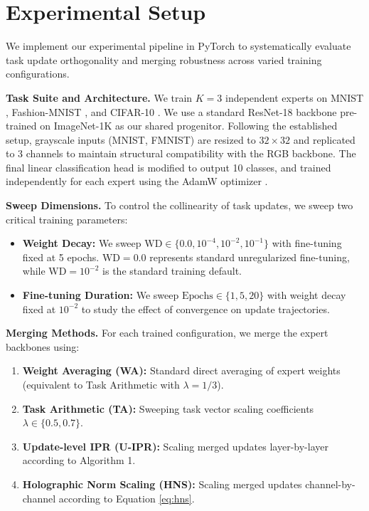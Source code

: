 \documentclass{article}
\theoremstyle{plain}
\theoremstyle{definition}
\theoremstyle{remark}
\begin{document}
\section{Experimental Setup}
\label{sec:setup}

We implement our experimental pipeline in PyTorch to systematically evaluate task update orthogonality and merging robustness across varied training configurations.

\textbf{Task Suite and Architecture.} We train $K=3$ independent experts on MNIST \cite{LeCun1998}, Fashion-MNIST \cite{Xiao2017}, and CIFAR-10 \cite{Krizhevsky2009}. We use a standard ResNet-18 backbone \cite{He2016} pre-trained on ImageNet-1K \cite{Deng2009} as our shared progenitor. Following the established setup, grayscale inputs (MNIST, FMNIST) are resized to $32\times 32$ and replicated to 3 channels to maintain structural compatibility with the RGB backbone. The final linear classification head is modified to output 10 classes, and trained independently for each expert using the AdamW optimizer \cite{Loshchilov2017}.

\textbf{Sweep Dimensions.} To control the collinearity of task updates, we sweep two critical training parameters:
\begin{itemize}
    \item \textbf{Weight Decay:} We sweep $\text{WD} \in \{0.0, 10^{-4}, 10^{-2}, 10^{-1}\}$ with fine-tuning fixed at 5 epochs. $\text{WD} = 0.0$ represents standard unregularized fine-tuning, while $\text{WD} = 10^{-2}$ is the standard training default.
    \item \textbf{Fine-tuning Duration:} We sweep $\text{Epochs} \in \{1, 5, 20\}$ with weight decay fixed at $10^{-2}$ to study the effect of convergence on update trajectories.
\end{itemize}

\textbf{Merging Methods.} For each trained configuration, we merge the expert backbones using:
\begin{enumerate}
    \item \textbf{Weight Averaging (WA):} Standard direct averaging of expert weights (equivalent to Task Arithmetic with $\lambda = 1/3$).
    \item \textbf{Task Arithmetic (TA):} Sweeping task vector scaling coefficients $\lambda \in \{0.5, 0.7\}$.
    \item \textbf{Update-level IPR (U-IPR):} Scaling merged updates layer-by-layer according to Algorithm 1.
    \item \textbf{Holographic Norm Scaling (HNS):} Scaling merged updates channel-by-channel according to Equation \ref{eq:hns}.
\end{enumerate}
\end{document}
